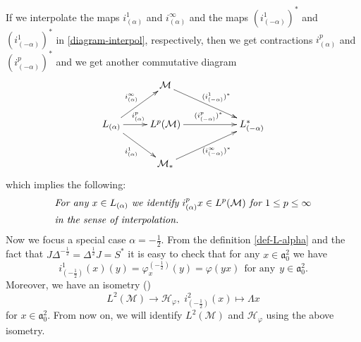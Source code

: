 \documentclass[10pt]{amsart}
\numberwithin{thm}{section}
\numberwithin{equation}{section}
\begin{document}
If we interpolate the maps $i^1_{(\alpha)}$ and $i^\infty_{(\alpha)}$ and the maps $(i^1_{(-\alpha)})^*$ and $(i^1_{(-\alpha)})^*$ in \eqref{diagram-interpol}, respectively, then we get contractions $i^p_{(\alpha)}$ and $(i^p_{(-\alpha)})^*$ and we get another commutative diagram
	$$\xymatrix{&{\mathcal{M}} \ar[drr]^{(i^1_{(-\alpha)})^*} & \\
	L_{(\alpha)} \ar[ur]^{i^\infty_{(\alpha)}} \ar[dr]_{i^1_{(\alpha)}} \ar[r]^{i^p_{(\alpha)}} & L^p({\mathcal{M}}) \ar[rr]^{(i^p_{(-\alpha)})^*}& &L^*_{(-\alpha)}\\
	&{\mathcal{M}}_* \ar[urr]_{(i^\infty_{(-\alpha)})^*}&}$$
which implies the following:
	\begin{align}\label{identify}
	& \text{\it For any $x\in L_{(\alpha)}$ we identify $i^p_{(\alpha)}x \in L^p({\mathcal{M}})$ for $1\le p \le \infty$}\\
	& \text{\it in the sense of interpolation.} \nonumber
	\end{align}
Now we focus a special case $\alpha = -\frac{1}{2}$.
From the definition \eqref{def-L-alpha} and the fact that $J\Delta^{-\frac{1}{2}} = \Delta^{\frac{1}{2}}J = S^*$ it is easy to check that 
for any $x \in \mathfrak{a}^2_0$ we have
	\begin{equation}\label{identify1}
	i^1_{(-\frac{1}{2})}(x)(y) = \varphi^{(-\frac{1}{2})}_x(y) = \varphi(yx)\;\, \text{for any}\;\, y\in \mathfrak{a}^2_0.
	\end{equation}
Moreover, we have an isometry (\cite[Lemma 5.4, Theorem 5.6]{Iz98})
	\begin{equation}\label{identify2}
	L^2({\mathcal{M}}) \rightarrow {\mathcal{H}}_\varphi,\; i^2_{(-\frac{1}{2})}(x)\mapsto \Lambda x
	\end{equation}
for $x \in \mathfrak{a}^2_0$.
From now on, we will identify $L^2({\mathcal{M}})$ and ${\mathcal{H}}_\varphi$ using the above isometry. 
\end{document}
